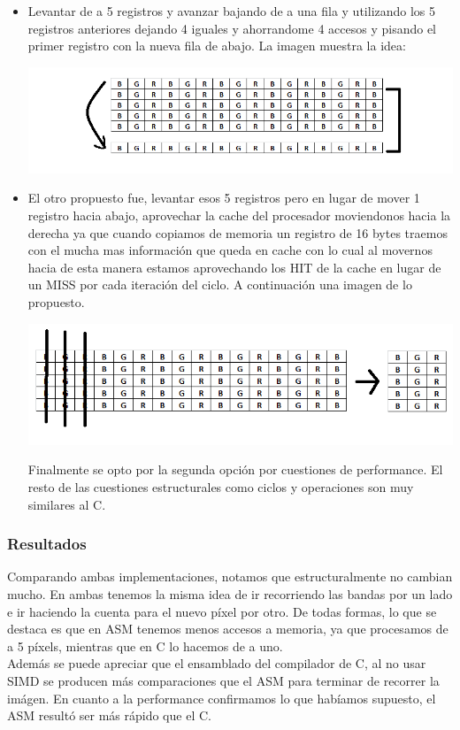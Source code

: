 \begin{itemize}
 \item Levantar de a 5 registros y avanzar bajando de a una fila y utilizando los 5 registros anteriores dejando 4 iguales y ahorrandome 4 accesos y pisando
el primer registro con la nueva fila de abajo. La imagen muestra la idea:
\begin{center}
 \includegraphics[scale=0.7]{imagenes/mover1.png}
\end{center}

\item El otro propuesto fue, levantar esos 5 registros pero en lugar de mover 1 registro hacia abajo, aprovechar la cache del procesador moviendonos hacia
la derecha ya que cuando copiamos de memoria un registro de 16 bytes traemos con el mucha mas informaci\'on que queda en cache con lo cual al movernos hacia
de esta manera estamos aprovechando los HIT de la cache en lugar de un MISS por cada iteraci\'on del ciclo. A continuaci\'on una imagen de lo propuesto.\newline
\begin{center}
 \includegraphics[scale=0.7]{imagenes/mover2.png}
\end{center}
Finalmente se opto por la segunda opci\'on por cuestiones de performance. El resto de las cuestiones estructurales como ciclos y operaciones son muy
similares al C.
\end{itemize}


\subsubsection{Resultados}
Comparando ambas implementaciones, notamos que estructuralmente no cambian mucho. En ambas tenemos la misma idea de ir recorriendo las bandas por un lado e ir haciendo la cuenta para el nuevo p\'ixel por otro. De todas formas, lo que se destaca es que en ASM tenemos menos accesos a memoria, ya que procesamos de a 5 p\'ixels, mientras que en C lo hacemos de a uno.\\
Adem\'as se puede apreciar que el ensamblado del compilador de C, al no usar SIMD se producen m\'as comparaciones que el ASM para terminar de recorrer la im\'agen.
En cuanto a la performance confirmamos lo que hab\'iamos supuesto, el ASM result\'o ser m\'as r\'apido que el C.\\

